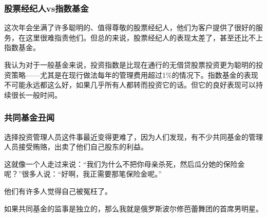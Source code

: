 \subsubsection*{股票经纪人vs指数基金}

这次年会坐满了许多聪明的、值得尊敬的股票经纪人，他们为客户提供了很好的服务，在这里很难指责他们。但总的来说，股票经纪人的表现太差了，甚至还比不上指数基金。
\par

我认为对于一般基金来说，投资指数是比现在通行的无借贷股票投资更为聪明的投资策略——尤其是在现行做法每年的管理费用超过1\%的情况下。指数基金的表现不可能永远都这么好，如果几乎所有人都转而投资它的话。但它的良好表现可以持续很长一般时间。
\par

\subsubsection*{共同基金丑闻}

选择投资管理人员这件事最近变得更难了，因为人们发现，有不少共同基金的管理人员接受贿赂，出卖了他们自己股东的利益。
\par

这就像一个人走过来说：“我们为什么不把你母亲杀死，然后瓜分她的保险金呢？”很多人说：“好啊，我正需要那笔保险金呢。”
\par

他们有许多人觉得自己被冤枉了。
\par

如果共同基金的监事是独立的，那么我就是俄罗斯波尔修芭蕾舞团的首席男明星。
\par
